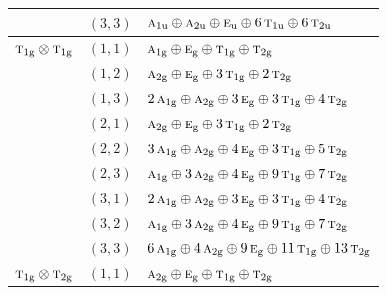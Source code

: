 \documentclass[11pt]{article}
\newcommand{\irr}[1]{\text{\normalfont\scshape #1}}
\newcommand{\ptag}[1]{\mathrm{#1}}
\begin{document}
\begin{longtable}{p{} c p{}}
 & $(3,3)$ & $\irr{a}_{1\ptag{u}}\oplus \irr{a}_{2\ptag{u}}\oplus \irr{e}_{\ptag{u}}\oplus 6\,\irr{t}_{1\ptag{u}}\oplus 6\,\irr{t}_{2\ptag{u}}$\\

\hline

$\irr{t}_{1\ptag{g}}\otimes \irr{t}_{1\ptag{g}}$ & $(1,1)$ & $\irr{a}_{1\ptag{g}}\oplus \irr{e}_{\ptag{g}}\oplus \irr{t}_{1\ptag{g}}\oplus \irr{t}_{2\ptag{g}}$\\

 & $(1,2)$ & $\irr{a}_{2\ptag{g}}\oplus \irr{e}_{\ptag{g}}\oplus 3\,\irr{t}_{1\ptag{g}}\oplus 2\,\irr{t}_{2\ptag{g}}$\\

 & $(1,3)$ & $2\,\irr{a}_{1\ptag{g}}\oplus \irr{a}_{2\ptag{g}}\oplus 3\,\irr{e}_{\ptag{g}}\oplus 3\,\irr{t}_{1\ptag{g}}\oplus 4\,\irr{t}_{2\ptag{g}}$\\

 & $(2,1)$ & $\irr{a}_{2\ptag{g}}\oplus \irr{e}_{\ptag{g}}\oplus 3\,\irr{t}_{1\ptag{g}}\oplus 2\,\irr{t}_{2\ptag{g}}$\\

 & $(2,2)$ & $3\,\irr{a}_{1\ptag{g}}\oplus \irr{a}_{2\ptag{g}}\oplus 4\,\irr{e}_{\ptag{g}}\oplus 3\,\irr{t}_{1\ptag{g}}\oplus 5\,\irr{t}_{2\ptag{g}}$\\

 & $(2,3)$ & $\irr{a}_{1\ptag{g}}\oplus 3\,\irr{a}_{2\ptag{g}}\oplus 4\,\irr{e}_{\ptag{g}}\oplus 9\,\irr{t}_{1\ptag{g}}\oplus 7\,\irr{t}_{2\ptag{g}}$\\

 & $(3,1)$ & $2\,\irr{a}_{1\ptag{g}}\oplus \irr{a}_{2\ptag{g}}\oplus 3\,\irr{e}_{\ptag{g}}\oplus 3\,\irr{t}_{1\ptag{g}}\oplus 4\,\irr{t}_{2\ptag{g}}$\\

 & $(3,2)$ & $\irr{a}_{1\ptag{g}}\oplus 3\,\irr{a}_{2\ptag{g}}\oplus 4\,\irr{e}_{\ptag{g}}\oplus 9\,\irr{t}_{1\ptag{g}}\oplus 7\,\irr{t}_{2\ptag{g}}$\\

 & $(3,3)$ & $6\,\irr{a}_{1\ptag{g}}\oplus 4\,\irr{a}_{2\ptag{g}}\oplus 9\,\irr{e}_{\ptag{g}}\oplus 11\,\irr{t}_{1\ptag{g}}\oplus 13\,\irr{t}_{2\ptag{g}}$\\

\hline

$\irr{t}_{1\ptag{g}}\otimes \irr{t}_{2\ptag{g}}$ & $(1,1)$ & $\irr{a}_{2\ptag{g}}\oplus \irr{e}_{\ptag{g}}\oplus \irr{t}_{1\ptag{g}}\oplus \irr{t}_{2\ptag{g}}$\\


\end{longtable}
\end{document}

